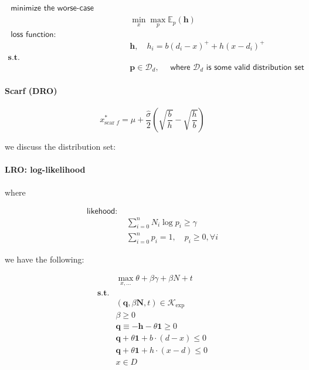 \documentclass[
  10pt,
  a4paper,
,tablecaptionabove
]{scrartcl}
\begin{document}
\[\begin{aligned} 
 \textsf{ minimize the worse-case expected cost: }  \\
 & \min_x \max_p \mathbb E_p(\mathbf h) \\
 \textsf{ loss function: }  \\
 &  \mathbf h, \quad h_i = b(d_i - x)^+ + h(x-d_i)^+\\
 \textbf {s.t. }  & \\
 & \mathbf p \in \mathcal D_d, \quad \textsf{ where } \mathcal D_d \textsf{ is some valid distribution set }
\end{aligned}\]

\hypertarget{scarf-dro}{%
\paragraph{Scarf (DRO)}\label{scarf-dro}}

\[x_{\text {scar } f}^{*}=\hat{\mu}+\frac{\hat{\sigma}}{2}(\sqrt{\frac{b}{h}}-\sqrt{\frac{h}{b}})\]

we discuss the distribution set:

\hypertarget{lro-log-likelihood}{%
\paragraph{LRO: log-likelihood}\label{lro-log-likelihood}}

where

\[\begin{aligned} 
 \textsf{likehood: } & \\
 & \sum_{i=0}^{n} N_{i} \log p_{i} \geq \gamma \\ 
 & \sum_{i=0}^{n} p_{i}=1, \quad p_{i} \geq 0, \forall i
 \end{aligned}\]

we have the following:

\[\begin{aligned}
  & \max_{x, ...} 
  \theta + \beta \gamma + \beta N + t \\
  \textbf {s.t.} \\
  & (\mathbf q, \beta\mathbf N, t) \in \mathcal K_{\exp} \\
  & \beta \ge 0 \\
  & \mathbf q \equiv - \mathbf h - \theta \mathbf 1 \ge 0\\
  & \mathbf q + \theta \mathbf 1 +  b\cdot(d - x) \le 0\\
  & \mathbf q +  \theta \mathbf 1 + h\cdot(x - d) \le 0\\
  & x \in D 
\end{aligned}\]
\end{document}
